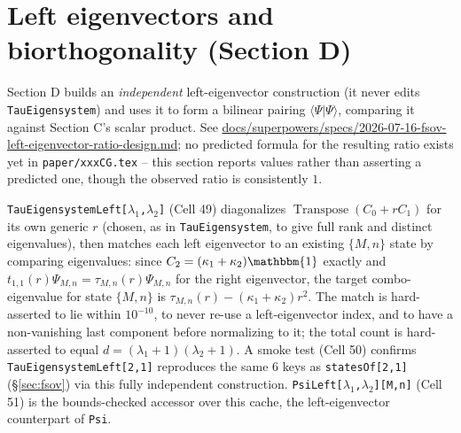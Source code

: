 \documentclass[11pt]{article}
\begin{document}
\section{Left eigenvectors and biorthogonality (Section D)}
\label{sec:lefteig}

Section D builds an \emph{independent} left-eigenvector construction (it never edits
\texttt{TauEigensystem}) and uses it to form a bilinear pairing $\langle\Psi|\Psi\rangle$, comparing
it against Section C's scalar product. See
\url{docs/superpowers/specs/2026-07-16-fsov-left-eigenvector-ratio-design.md}; no predicted
formula for the resulting ratio exists yet in \texttt{paper/xxxCG.tex} -- this section reports
values rather than asserting a predicted one, though the observed ratio is consistently $1$.

\texttt{TauEigensystemLeft[$\lambda_1$,$\lambda_2$]} (Cell 49) diagonalizes
$\operatorname{Transpose}(C_0+rC_1)$ for its own generic $r$ (chosen, as in
\texttt{TauEigensystem}, to give full rank and distinct eigenvalues), then matches each left
eigenvector to an existing $\{M,n\}$ state by comparing eigenvalues: since $C_2=(\kappa_1+\kappa_2)
\mathbbm{1}$ exactly and $t_{1,1}(r)\Psi_{M,n}=\tau_{M,n}(r)\Psi_{M,n}$ for the right eigenvector,
the target combo-eigenvalue for state $\{M,n\}$ is $\tau_{M,n}(r)-(\kappa_1+\kappa_2)r^2$. The
match is hard-asserted to lie within $10^{-10}$, to never re-use a left-eigenvector index, and to
have a non-vanishing last component before normalizing to it; the total count is hard-asserted to
equal $d=(\lambda_1+1)(\lambda_2+1)$. A smoke test (Cell 50) confirms
\texttt{TauEigensystemLeft[2,1]} reproduces the same 6 keys as \texttt{statesOf[2,1]}
(\S\ref{sec:fsov}) via this fully independent construction. \texttt{PsiLeft[$\lambda_1$,$\lambda_2$][M,n]}
(Cell 51) is the bounds-checked accessor over this cache, the left-eigenvector counterpart of
\texttt{Psi}.
\end{document}
